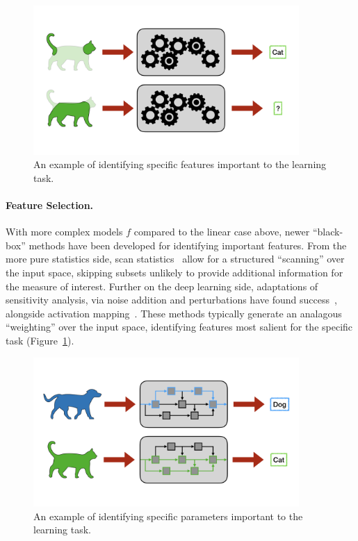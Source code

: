 \begin{figure}
    \centering
    \includegraphics[trim={0 3cm 0 3cm},clip,width=0.9\textwidth]{diss/1_intro/figs/feat_select.png}
    \caption[Visualization of feature selection]{An example of identifying specific features important to the learning task.}
    \label{fig:feat_select}
\end{figure}
\paragraph{Feature Selection.} 
With more complex models $f$ compared to the linear case above, newer ``black-box'' methods have been developed for identifying important features. From the more pure statistics side, scan statistics~\citep{scanstat,scanstatlrt} allow for a structured ``scanning'' over the input space, skipping subsets unlikely to provide additional information for the measure of interest.
Further on the deep learning side, adaptations of sensitivity analysis, via noise addition and perturbations have found success~\citep{yeung2010sensitivity,zhang2015sensitivity}, alongside activation mapping~\citep{cam,selvaraju2017grad}.
These methods typically generate an analagous ``weighting'' over the input space, identifying features most salient for the specific task (Figure~\ref{fig:feat_select}).

\begin{figure}
    \centering
    \includegraphics[trim={0 3cm 0 3cm},clip,width=0.9\textwidth]{diss/1_intro/figs/param_select.png}
    \caption[Visualization of parameter selection]{An example of identifying specific parameters important to the learning task.}
    \label{fig:param_select}
\end{figure}
